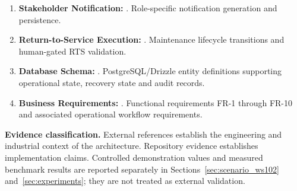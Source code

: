 \documentclass[10pt,twocolumn,a4paper]{article}
\begin{document}
\begin{enumerate}[label={E\arabic*},leftmargin=*,itemsep=2pt]
\item \textbf{Stakeholder Notification:} . Role-specific notification generation and persistence.
\item \textbf{Return-to-Service Execution:} . Maintenance lifecycle transitions and human-gated RTS validation.
\item \textbf{Database Schema:} . PostgreSQL/Drizzle entity definitions supporting operational state, recovery state and audit records.
\item \textbf{Business Requirements:} . Functional requirements FR-1 through FR-10 and associated operational workflow requirements.
\end{enumerate}

\noindent
\textbf{Evidence classification.}
External references establish the engineering and industrial context of the
architecture. Repository evidence establishes implementation claims. Controlled
demonstration values and measured benchmark results are reported separately in
Sections~\ref{sec:scenario_ws102} and~\ref{sec:experiments}; they are not
treated as external validation.
\end{document}
